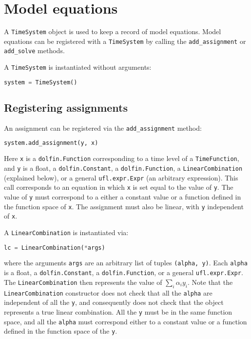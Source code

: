 \documentclass[a4paper]{book}
\begin{document}
\section{Model equations}

A \verb+TimeSystem+ object is used to keep a record of model equations.
Model equations can be registered with a \verb+TimeSystem+ by calling the
\verb+add_assignment+ or \verb+add_solve+ methods.

A \verb+TimeSystem+ is instantiated without arguments:
\begin{lstlisting}[language = python, frame = single, basicstyle=\footnotesize]
system = TimeSystem()
\end{lstlisting}

\subsection{Registering assignments}

An assignment can be registered via the \verb+add_assignment+ method:
\begin{lstlisting}[language = python, frame = single, basicstyle=\footnotesize]
system.add_assignment(y, x)
\end{lstlisting}
Here \verb+x+ is a \verb+dolfin.Function+ corresponding to a time level of a
\verb+TimeFunction+, and \verb+y+ is a float, a \verb+dolfin.Constant+, a
\verb+dolfin.Function+, a \verb+LinearCombination+ (explained below), or a
general \verb+ufl.expr.Expr+ (an arbitrary expression). This call corresponds to
an equation in which \verb+x+ is set equal to the value of \verb+y+. The value
of \verb+y+ must correspond to a either a constant value or a function defined
in the function space of \verb+x+. The assignment must also be linear, with
\verb+y+ independent of \verb+x+.

A \verb+LinearCombination+ is instantiated via:
\begin{lstlisting}[language = python, frame = single, basicstyle=\footnotesize]
lc = LinearCombination(*args)
\end{lstlisting}
where the arguments \verb+args+ are an arbitrary list of tuples
\verb+(alpha, y)+. Each \verb+alpha+ is a float, a \verb+dolfin.Constant+, a
\verb+dolfin.Function+, or a general \linebreak \verb+ufl.expr.Expr+. The
\verb+LinearCombination+ then represents the value of $\sum_i \alpha_i y_i$.
Note that the \verb+LinearCombination+ constructor does not check that all the
\verb+alpha+ are independent of all the \verb+y+, and consequently does not
check that the object represents a true linear combination. All the \verb+y+
must be in the same function space, and all the \verb+alpha+ must correspond
either to a constant value or a function defined in the function space of the
\verb+y+.
\end{document}
